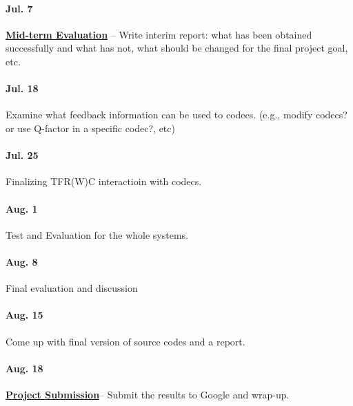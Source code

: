 \paragraph{\textsf{Jul. 7}} \underline{\textbf{Mid-term Evaluation}} -- Write
interim report: what has been obtained successfully and what has not, what
should be changed for the final project goal, etc.

\paragraph{\textsf{Jul. 18}} Examine what feedback information can be used to
codecs.  (e.g., modify codecs? or use Q-factor in a specific codec?, etc)

\paragraph{\textsf{Jul. 25}} Finalizing TFR(W)C interactioin with codecs.

\paragraph{\textsf{Aug. 1}} Test and Evaluation for the whole systems.

\paragraph{\textsf{Aug. 8}} Final evaluation and discussion

\paragraph{\textsf{Aug. 15}} Come up with final version of source codes and a
report.

\paragraph{\textsf{Aug. 18}} \underline{\textbf{Project Submission}}-- Submit
the results to Google and wrap-up.

\newpage

